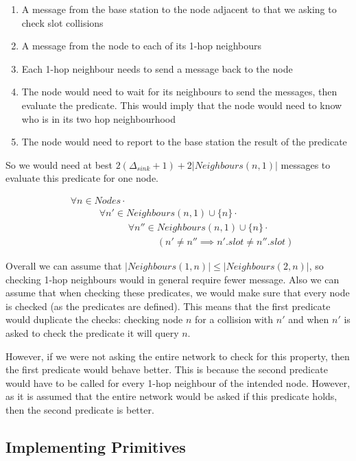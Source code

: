 \begin{enumerate}
	\item A message from the base station to the node adjacent to that we asking to check slot collisions
	\item A message from the node to each of its 1-hop neighbours
	\item Each 1-hop neighbour needs to send a message back to the node
	\item The node would need to wait for its neighbours to send the messages, then evaluate the predicate. This would imply that the node would need to know who is in its two hop neighbourhood
	\item The node would need to report to the base station the result of the predicate
\end{enumerate}

So we would need at best $2(\Delta_{sink} + 1) + 2|Neighbours(n, 1)|$ messages to evaluate this predicate for one node.

\begin{align}
\label{eq:1-hop-slot-pred}
&				\forall n \in Nodes \cdot \\
& \hspace{3em}		\forall n' \in Neighbours(n, 1) \cup \{n\} \cdot \\
& \hspace{6em}			\forall n'' \in Neighbours(n, 1) \cup \{n\} \cdot \\
& \hspace{9em}				(n' \not= n'' \implies n'.slot \neq n''.slot)
\end{align}

Overall we can assume that $|Neighbours(1, n)| \leq |Neighbours(2, n)|$, so checking 1-hop neighbours would in general require fewer message. Also we can assume that when checking these predicates, we would make sure that every node is checked (as the predicates are defined). This means that the first predicate would duplicate the checks: checking node $n$ for a collision with $n'$ and when $n'$ is asked to check the predicate it will query $n$.

However, if we were not asking the entire network to check for this property, then the first predicate would behave better. This is because the second predicate would have to be called for every 1-hop neighbour of the intended node. However, as it is assumed that the entire network would be asked if this predicate holds, then the second predicate is better.


\subsection{Implementing Primitives}

